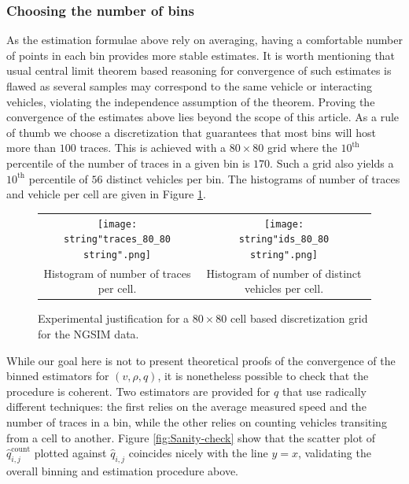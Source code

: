 \documentclass[preprint]{elsarticle}
\DeclareMathOperator{\cnt}{count}
\begin{document}
\subsubsection{Choosing the number of bins}

As the estimation formulae above rely on averaging, having a comfortable
number of points in each bin provides more stable estimates. It is worth mentioning that usual central limit theorem based reasoning for convergence of such estimates is flawed as several samples may correspond to the same vehicle or interacting vehicles, violating the independence assumption of the theorem. Proving the convergence of the estimates above lies beyond the scope of this article. As a rule of thumb we choose a discretization that guarantees that most bins will host more than $100$ traces. This is achieved with a $80\times80$ grid where the $10^{\text{th}}$ percentile of the number of traces in a given bin is $170$. Such a grid also yields a $10^{\text{th}}$ percentile of $56$ distinct vehicles per bin. The histograms of number of traces and vehicle per cell are given in Figure \ref{fig:Grid control}.

\begin{figure}[H]
\centering
\begin{tabular}{cc}
\texttt{[image: \\string"traces\_80\_80\\string".png]} & \texttt{[image: \\string"ids\_80\_80\\string".png]}\tabularnewline
Histogram of number of traces per cell. & Histogram of number of distinct vehicles per cell. \tabularnewline
\end{tabular}
\caption{Experimental justification for a $80\times 80$ cell based discretization
grid for the NGSIM data.}
\label{fig:Grid control}
\end{figure}

While our goal here is not to present theoretical proofs of the convergence of the binned estimators for $\left(v,\rho,q\right)$, it is nonetheless possible to check that the procedure is coherent. Two estimators are provided for $q$ that use radically
different techniques: the first relies on the average measured speed and the number of traces in a bin, while the other relies on counting vehicles transiting from a cell to another. Figure \ref{fig:Sanity-check} show that the scatter plot of $\widehat{q}_{i,j}^{\cnt}$ plotted against $\widehat{q}_{i,j}$ coincides nicely with the line $y=x$, validating the overall binning and estimation procedure above.
\end{document}

